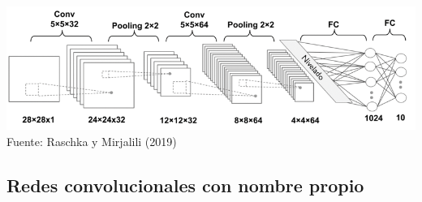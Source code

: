 \documentclass[
  a4paper,
  DIV=11,
  numbers=noendperiod]{scrreprt}
\begin{document}
\includegraphics{imagenes/capitulo1/convolucion_completa.png} Fuente:
Raschka y Mirjalili (2019)

\hypertarget{redes-convolucionales-con-nombre-propio}{%
\subsection{Redes convolucionales con nombre
propio}\label{redes-convolucionales-con-nombre-propio}}
\end{document}
